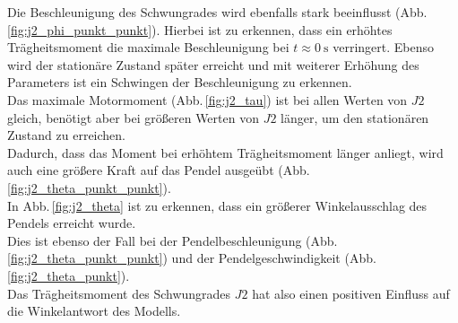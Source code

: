 Die Beschleunigung des Schwungrades wird ebenfalls stark beeinflusst (Abb.\,\ref{fig:j2_phi_punkt_punkt}).
Hierbei ist zu erkennen, dass ein erhöhtes Trägheitsmoment die maximale Beschleunigung bei $t\approx\SI{0}{\s}$ verringert. 
Ebenso wird der stationäre Zustand später erreicht und mit weiterer Erhöhung des Parameters ist ein Schwingen der Beschleunigung zu erkennen.\\
   
Das maximale Motormoment (Abb.\,\ref{fig:j2_tau}) ist bei allen Werten von $J2$ gleich, benötigt aber bei größeren Werten von $J2$ länger, um den stationären Zustand zu erreichen.\\
Dadurch, dass das Moment bei erhöhtem Trägheitsmoment länger anliegt, wird auch eine größere Kraft auf das Pendel ausgeübt (Abb.\,\ref{fig:j2_theta_punkt_punkt}).\\
In Abb.\,\ref{fig:j2_theta} ist zu erkennen, dass ein größerer Winkelausschlag des Pendels erreicht wurde.\\
Dies ist ebenso der Fall bei der Pendelbeschleunigung (Abb.\,\ref{fig:j2_theta_punkt_punkt}) und der Pendelgeschwindigkeit (Abb.\,\ref{fig:j2_theta_punkt}).\\

 Das Trägheitsmoment des Schwungrades $J2$ hat also einen positiven Einfluss auf die Winkelantwort des Modells.\\  
 
